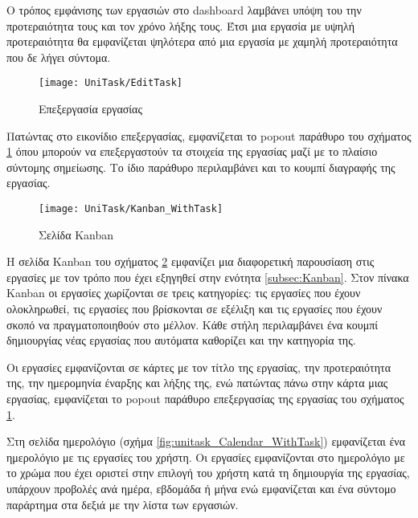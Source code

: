         Ο τρόπος εμφάνισης των εργασιών στο dashboard λαμβάνει υπόψη του την προτεραιότητα τους και τον χρόνο λήξης τους. Έτσι μια εργασία με υψηλή προτεραιότητα θα εμφανίζεται ψηλότερα από μια εργασία με χαμηλή προτεραιότητα που δε λήγει σύντομα.

        \begin{figure}[h!] \noindent \centering
            \texttt{[image: UniTask/EditTask]}
            \caption{\centering Επεξεργασία εργασίας}
            \label{fig:unitask_EditTask}
        \end{figure}

        Πατώντας στο εικονίδιο επεξεργασίας, εμφανίζεται το popout παράθυρο του σχήματος \ref{fig:unitask_EditTask} όπου μπορούν να επεξεργαστούν τα στοιχεία της εργασίας μαζί με το πλαίσιο σύντομης σημείωσης. Το ίδιο παράθυρο περιλαμβάνει και το κουμπί διαγραφής της εργασίας.

        \begin{figure}[h!] \noindent \centering
            \texttt{[image: UniTask/Kanban\_WithTask]}
            \caption{\centering Σελίδα Kanban}
            \label{fig:unitask_Kanban_WithTask}
        \end{figure}

        Η σελίδα {\ZonaSB Kanban} του σχήματος \ref{fig:unitask_Kanban_WithTask} εμφανίζει μια διαφορετική παρουσίαση στις εργασίες με τον τρόπο που έχει εξηγηθεί στην ενότητα \ref{subsec:Kanban}. Στον πίνακα Kanban οι εργασίες χωρίζονται σε τρεις κατηγορίες: τις εργασίες που έχουν ολοκληρωθεί, τις εργασίες που βρίσκονται σε εξέλιξη και τις εργασίες που έχουν σκοπό να πραγματοποιηθούν στο μέλλον. Κάθε στήλη περιλαμβάνει ένα κουμπί δημιουργίας νέας εργασίας που αυτόματα καθορίζει και την κατηγορία της.

        Οι εργασίες εμφανίζονται σε κάρτες με τον τίτλο της εργασίας, την προτεραιότητα της, την ημερομηνία έναρξης και λήξης της, ενώ πατώντας πάνω στην κάρτα μιας εργασίας, εμφανίζεται το popout παράθυρο επεξεργασίας της εργασίας του σχήματος \ref{fig:unitask_EditTask}.

        Στη σελίδα {\ZonaSB ημερολόγιο} (σχήμα \ref{fig:unitask_Calendar_WithTask}) εμφανίζεται ένα ημερολόγιο με τις εργασίες του χρήστη. Οι εργασίες εμφανίζονται στο ημερολόγιο με το χρώμα που έχει οριστεί στην επιλογή του χρήστη κατά τη δημιουργία της εργασίας, υπάρχουν προβολές ανά ημέρα, εβδομάδα ή μήνα ενώ εμφανίζεται και ένα σύντομο παράρτημα στα δεξιά με την λίστα των εργασιών.

